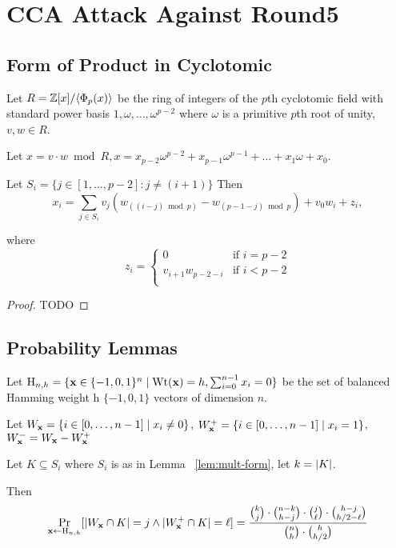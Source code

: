 \section{CCA Attack Against Round5}
\label{sec:cca-attack-against}

\subsection{Form of Product in Cyclotomic}
\label{sec:form-prod-cycl}



\begin{lemma}
\label{lem:mult-form}
Let $R=\mathbb{Z}[x]/\langle\Phi_{p}(x)\rangle$ be the ring of integers of the $p$th cyclotomic field with standard power basis $1,\omega,\ldots,\omega^{p-2}$ where $\omega$ is a primitive $p$th root of unity, $v, w \in R$.

Let $x=v \cdot w \bmod{R}, x=x_{p-2}\omega^{p-2}+x_{p-1}\omega^{p-1}+\ldots+x_{1}\omega+x_{0}$. 

Let $S_{i}=\{j \in [1,\ldots,p-2]: j \neq (i+1)\}$
Then 
\[x_{i}=\sum_{j \in S_{i}}v_{j}\left(w_{((i-j)\bmod{p})}-w_{(p-1-j)\bmod{p}}\right)+v_0w_{i}+z_{i},\]

where 
\[z_i=\begin{cases}0&\text{if }i=p-2\\
v_{i+1}w_{p-2-i}&\text{if }i<p-2\\\end{cases}\]
\end{lemma}

\begin{proof}
TODO
\end{proof}


\subsection{Probability Lemmas}
\label{sec:probability-lemmas}

\begin{lemma}
\label{lem:prob-hits}
Let $\text{H}_{n,h} = \{\mathbf{x} \in \{-1,0,1\}^{n} \mid \text{Wt}(\mathbf{x})=h,\sum_{i=0}^{n-1}x_i=0\}$ be the set of balanced Hamming weight h $\{-1,0,1\}$ vectors of dimension $n$.

Let $W_{\mathbf{x}} = \{i \in [0,\ldots,n-1] \mid x_{i} \neq 0\}$,
$W_{\mathbf{x}}^{+} = \{i \in [0,\ldots,n-1] \mid x_{i} = 1\}$,
$W_{\mathbf{x}}^{-}=W_{\mathbf{x}} - W_{\mathbf{x}}^{+}$ 





Let $K \subseteq S_{i}$ where $S_{i}$ is as in Lemma
~\ref{lem:mult-form}, let $k=\lvert K\rvert$. 


Then \[\Pr_{\mathbf{x} \gets \text{H}_{n,h}}[\lvert W_{\mathbf{x}} \cap K\rvert =
  j \wedge \lvert W_{\mathbf{x}}^{+} \cap K\rvert= \ell]
  =\frac{\binom{k}{j} \cdot \binom{n-k}{h-j} \cdot
    \binom{j}{\ell} \cdot \binom{h-j}{h/2-\ell}}{\binom{n}{h} \cdot \binom{h}{h/2}}\]
\end{lemma}

